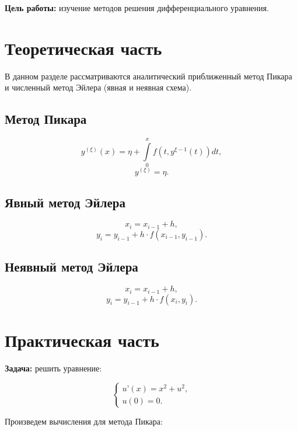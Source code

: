 \documentclass[a4paper, 14pt]{article}
\begin{document}
	\textbf{Цель работы:} изучение методов решения дифференциального уравнения.\\
	
	
	\section{Теоретическая часть}
	
	В данном разделе рассматриваются аналитический приближенный метод Пикара и численный метод Эйлера (явная и неявная схема).
	
	\subsection{Метод Пикара}
	
	$$y^{(\xi)}(x) = \eta + \int\limits_0^x f(t, y^{\xi-1}(t))dt,$$ 
	$$y^{(\xi)} = \eta.$$
	
	\subsection{Явный метод Эйлера}
	
	$$x_i = x_{i-1} + h,$$ 
	$$y_i = y_{i-1} + h \cdot f(x_{i-1}, y_{i-1}).$$
	
	\subsection{Неявный метод Эйлера}
	
	$$x_i = x_{i-1} + h,$$ 
	$$y_i = y_{i-1} + h \cdot f(x_i, y_i).$$
	
	\section{Практическая часть}
	
	\textbf{Задача:} решить уравнение:
	
	\begin{equation*}
 \begin{cases}
   u’(x) = x^2 + u^2,
   \\
   u(0) = 0.
 \end{cases}
\end{equation*}
	
	Произведем вычисления для метода Пикара:
\end{document}

